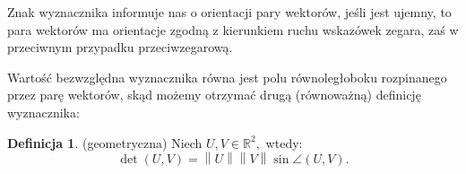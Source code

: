 \documentclass[12pt,a4paper]{article}
\newcommand{\norm}[1]{\left\lVert#1\right\rVert}
\newcommand{\RR}{\mathbb{R}}
\theoremstyle{theorem}
\theoremstyle{theorem}
\theoremstyle{definition}
\newtheorem{df}{Definicja}[section]
\theoremstyle{definition}
\theoremstyle{proof}
\theoremstyle{definition}
\begin{document}
Znak wyznacznika informuje nas o orientacji pary wektorów, jeśli jest ujemny, to para wektorów ma orientacje zgodną z kierunkiem ruchu wskazówek zegara, zaś w przeciwnym przypadku przeciwzegarową.

Wartość bezwzględna wyznacznika równa jest polu równoległoboku rozpinanego przez parę wektorów, skąd możemy otrzymać drugą (równoważną) definicję wyznacznika:
\begin{df}(geometryczna) Niech $U,V\in\RR^2,$ wtedy: $$\det(U,V) = \norm{U}\norm{V}\sin\angle(U,V).$$ \end{df}
\end{document}
